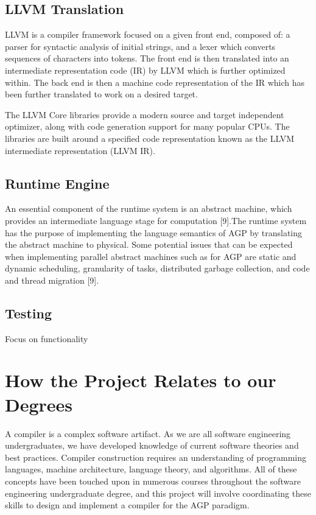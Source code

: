 \documentclass[11pt]{article}
\begin{document}
\subsection{LLVM Translation}

LLVM is a compiler framework focused on a given front end, composed of: a parser for syntactic analysis of initial strings,  and a lexer which converts sequences of characters into tokens. The front end is then translated into an intermediate representation code (IR) by LLVM which is further optimized within. The back end is then a machine code representation of the IR which has been further translated to work on a desired target.

The LLVM Core libraries provide a modern source and target independent optimizer, along with code generation support for many popular CPUs. The libraries are built around a specified code representation known as the LLVM intermediate representation (LLVM IR).


\subsection{Runtime Engine}

An essential component of the runtime system is an abstract machine, which provides an intermediate language stage for computation [9].The runtime system has the purpose of implementing the language semantics of AGP by translating the abstract machine to physical. Some potential issues that can be expected when implementing parallel abstract machines such as for AGP are static and dynamic scheduling, granularity of tasks, distributed garbage collection, and code and thread migration [9].

\subsection{Testing}

Focus on functionality

\section{How the Project Relates to our Degrees}

A compiler is a complex software artifact. As we are all software engineering undergraduates, we have developed knowledge of current software theories and best practices. Compiler construction requires an understanding of programming languages, machine architecture, language theory, and algorithms. All of these concepts have been touched upon in numerous courses throughout the software engineering undergraduate degree, and this project will involve coordinating these skills to design and implement a compiler for the AGP paradigm. 
\end{document}
